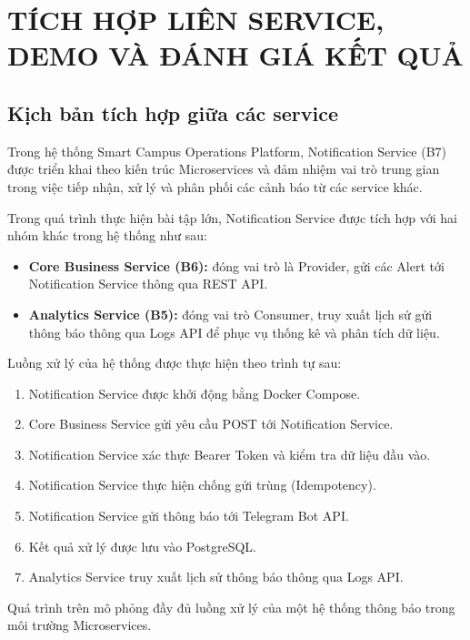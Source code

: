 \chapter{TÍCH HỢP LIÊN SERVICE, DEMO VÀ ĐÁNH GIÁ KẾT QUẢ}

\section{Kịch bản tích hợp giữa các service}

Trong hệ thống Smart Campus Operations Platform, Notification Service (B7) được triển khai theo kiến trúc Microservices và đảm nhiệm vai trò trung gian trong việc tiếp nhận, xử lý và phân phối các cảnh báo từ các service khác.

Trong quá trình thực hiện bài tập lớn, Notification Service được tích hợp với hai nhóm khác trong hệ thống như sau:

\begin{itemize}
\item \textbf{Core Business Service (B6):} đóng vai trò là Provider, gửi các Alert tới Notification Service thông qua REST API.
\item \textbf{Analytics Service (B5):} đóng vai trò Consumer, truy xuất lịch sử gửi thông báo thông qua Logs API để phục vụ thống kê và phân tích dữ liệu.
\end{itemize}

Luồng xử lý của hệ thống được thực hiện theo trình tự sau:

\begin{enumerate}
\item Notification Service được khởi động bằng Docker Compose.
\item Core Business Service gửi yêu cầu POST tới Notification Service.
\item Notification Service xác thực Bearer Token và kiểm tra dữ liệu đầu vào.
\item Notification Service thực hiện chống gửi trùng (Idempotency).
\item Notification Service gửi thông báo tới Telegram Bot API.
\item Kết quả xử lý được lưu vào PostgreSQL.
\item Analytics Service truy xuất lịch sử thông báo thông qua Logs API.
\end{enumerate}

Quá trình trên mô phỏng đầy đủ luồng xử lý của một hệ thống thông báo trong môi trường Microservices.


